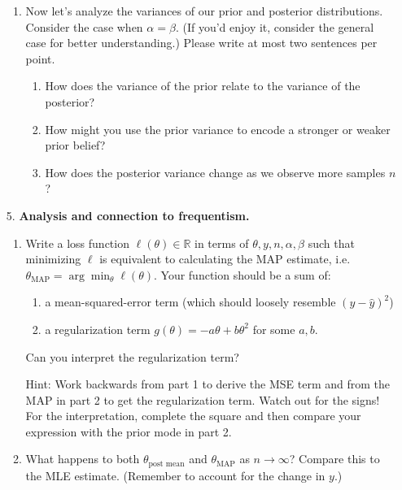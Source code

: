 \documentclass[submit]{harvardml}
\begin{document}
\begin{framed}
\begin{enumerate}
\begin{enumerate}
        \item Now let's analyze the variances of our prior and posterior distributions. Consider the case when $\alpha = \beta$. (If you'd enjoy it, consider the general case for better understanding.) Please write at most two sentences per point.
              \begin{enumerate}
                \item How does the variance of the prior relate to the variance of the posterior?
                \item How might you use the prior variance to encode a stronger or weaker prior belief?
                \item How does the posterior variance change as we observe more samples $n$?
              \end{enumerate}
      \end{enumerate}

    \item[5.]
      \textbf{Analysis and connection to frequentism.}

      \begin{enumerate}
        \item
              Write a loss function \(\ell(\theta) \in \mathbb{R}\) in terms of
              \(\theta, y, n, \alpha, \beta\) such that minimizing \(\ell\) is
              equivalent to calculating the MAP estimate,
              i.e.~\(\theta_{\text{MAP}} = \arg \min_{\theta} \ell(\theta)\). Your
              function should be a sum of:
              \begin{enumerate}
                \item a mean-squared-error term (which should loosely resemble $(y - \hat y)^2$)
                \item a
                      regularization term \(g(\theta) = - a \theta + b \theta^{2}\) for some $a, b$.
              \end{enumerate}

              Can you interpret the regularization term?

              Hint: Work backwards from part 1 to derive the MSE term and from the MAP in part 2 to get the regularization term. Watch out for the signs! For the interpretation, complete the square and then compare your expression with the prior mode in part 2.
        \item
              What happens to both $\theta_{\text{post mean}}$ and $\theta_{\text{MAP}}$ as \(n \to \infty\)? Compare this to the MLE estimate.
              (Remember to account for the change in \(y\).)
      \end{enumerate}

  \end{enumerate}

\end{framed}
\end{document}

